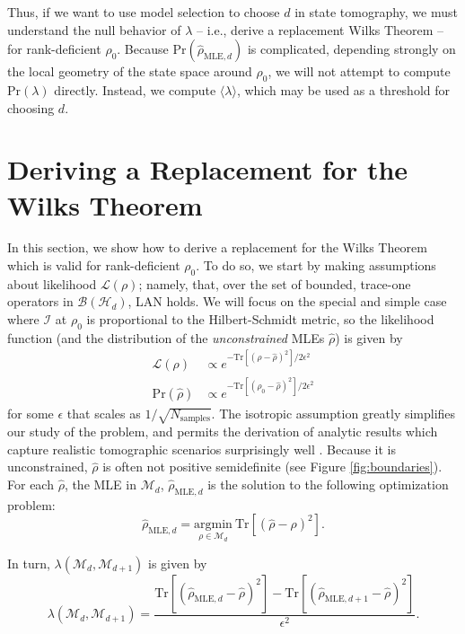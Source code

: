\documentclass[aps,pra, twocolumn]{revtex4-1}
\newcommand{\M}{\mathcal{M}}
\newcommand{\cL}{\mathcal{L}}
\newcommand{\Fi}{\mathcal{I}}
\newcommand{\rhohat}{\hat{\rho}}
\begin{document}
Thus, if we want to use model selection to choose $d$ in state tomography, we must understand the null behavior of $\lambda$ -- i.e., derive a replacement Wilks Theorem -- for rank-deficient $\rho_{0}$. Because $\mathrm{Pr}(\hat{\rho}_{\mathrm{MLE}, d})$ is complicated, depending strongly on the local geometry of the state space around $\rho_{0}$, we will not attempt to compute $\mathrm{Pr}(\lambda)$ directly. Instead, we compute $\langle \lambda \rangle$, which may be used as a threshold for choosing $d$.

\section{Deriving a Replacement for the Wilks Theorem}

In this section, we show how to derive a replacement for the Wilks Theorem which is valid for rank-deficient $\rho_{0}$. 
To do so, we start by making assumptions about likelihood $\mathcal{L}(\rho)$; namely, that, over the set of bounded, trace-one operators in $\mathcal{B}(\mathcal{H}_{d})$, LAN holds. We will focus on the special and simple case where $\Fi$ at $\rho_{0}$ is  proportional to the Hilbert-Schmidt metric, so the likelihood function (and the distribution of the \emph{unconstrained} MLEs $\rhohat$) is given by 
\begin{align}
\label{eq:likelihood}
\cL(\rho) & \propto e^{-\mathrm{Tr}[(\rho - \rhohat)^{2}]/2\epsilon^{2}}\\
\mathrm{Pr}(\rhohat) &\propto e^{-\mathrm{Tr}[(\rho_{0} - \rhohat)^{2}]/2\epsilon^{2}}
\end{align}
for some $\epsilon$ that scales as $1 / \sqrt{N_{\mathrm{samples}}}$.  The isotropic assumption greatly simplifies our study of the problem, and permits the derivation of analytic results which capture realistic tomographic scenarios surprisingly well \cite{Smolin2012}. 
Because it is unconstrained, $\rhohat$ is often not positive semidefinite (see Figure \ref{fig:boundaries}). For each $\rhohat$, the MLE in $\M_{d}$, $\hat{\rho}_{\mathrm{MLE},d}$ is the solution to the following optimization problem:
\begin{equation}
\label{eq:mleopt}
\hat{\rho}_{\mathrm{MLE}, d} = \underset{\rho \in \M_{d}}{\mathrm{argmin}}~\mathrm{Tr}[(\rhohat - \rho)^{2}].
\end{equation}

In turn, $\lambda(\M_{d}, \M_{d+1})$ is given by
\begin{equation}
\label{eq:llrs}
\lambda(\M_{d}, \M_{d+1}) = \frac{\mathrm{Tr}[(\hat{\rho}_{\mathrm{MLE}, d}  - \rhohat)^{2}] - \mathrm{Tr}[(\hat{\rho}_{\mathrm{MLE}, d+1} - \rhohat)^{2}]}{\epsilon^{2}}.
\end{equation}
\end{document}

